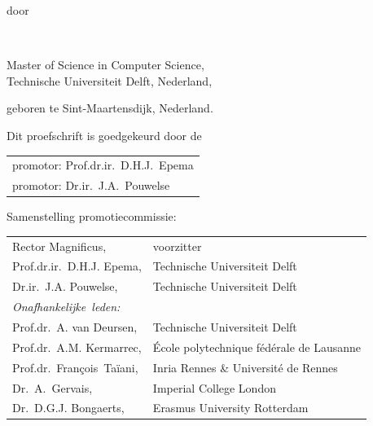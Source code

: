 \begin{titlepage}
\begin{center}
\bigskip
\bigskip

door

\bigskip
\bigskip

\makeatletter
{\Large\titlefont\bfseries\@firstname\ \titleshape{\MakeUppercase{\@lastname}}}
\makeatother

\bigskip
\bigskip

Master of Science in Computer Science, \\
Technische Universiteit Delft, Nederland,

geboren te Sint-Maartensdijk, Nederland.

\vspace*{2\bigskipamount}

\end{center}

\clearpage
\thispagestyle{empty}

\noindent Dit proefschrift is goedgekeurd door de

\medskip\noindent
\begin{tabular}{l}
    promotor: Prof.dr.ir.\ D.H.J.\ Epema \\
    promotor: Dr.ir.\ J.A.\ Pouwelse
\end{tabular}

\bigskip
\noindent Samenstelling promotiecommissie:

\medskip\noindent
\begin{tabular}{p{4.5cm}l}
    Rector Magnificus, & voorzitter \\
    Prof.dr.ir.\ D.H.J. Epema, & Technische Universiteit Delft \\
    Dr.ir.\ J.A. Pouwelse, & Technische Universiteit Delft \\

    \medskip
    \mbox{\emph{Onafhankelijke leden:}} & \\
    Prof.dr.\ A. van Deursen, & Technische Universiteit Delft \\
    Prof.dr.\ A.M. Kermarrec, & École polytechnique fédérale de Lausanne \\
    Prof.dr.\ François\ Taïani, & Inria Rennes \& Université de Rennes \\
    Dr.\ A.\ Gervais, & Imperial College London \\
    Dr.\ D.G.J. Bongaerts, & Erasmus University Rotterdam \\
    

\end{tabular}
\end{titlepage}
